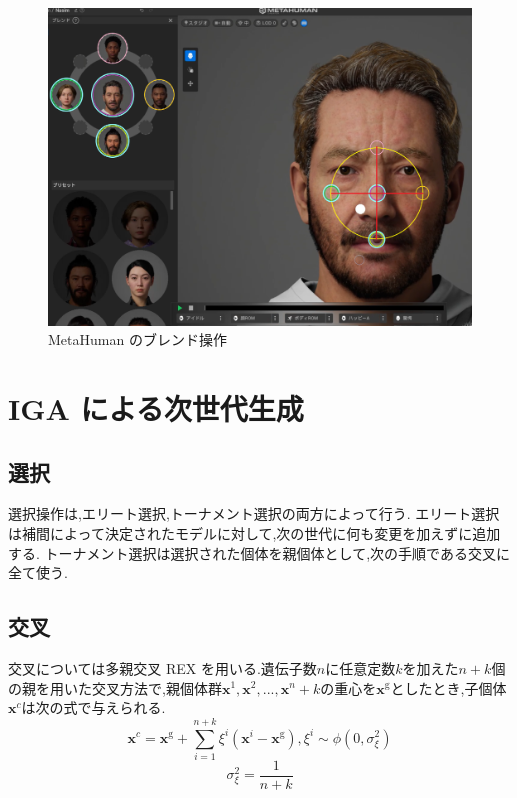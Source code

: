 \begin{figure}[h]
	\begin{center}
		\includegraphics[scale=0.4]{./imgs/metahuman2.PNG}
		\caption{MetaHuman のブレンド操作\label{fig:metahuman_cc2}}
	\end{center}
\end{figure}

\clearpage
\section{IGA による次世代生成}

\subsection{選択}
選択操作は,エリート選択,トーナメント選択の両方によって行う.
エリート選択は補間によって決定されたモデルに対して,次の世代に何も変更を加えずに追加する.
トーナメント選択は選択された個体を親個体として,次の手順である交叉に全て使う.

\subsection{交叉}
交叉については多親交叉 REX を用いる.遺伝子数$n$に任意定数$k$を加えた$n+k$個の親を用いた交叉方法で,親個体群$\bm{x}^1,\bm{x}^2,...,\bm{x}^n+k$の重心を$\bm{x}^\mathrm{g}$としたとき,子個体$\bm{x}^c$は次の式で与えられる.
\begin{equation}\label{eq:rex1}
    \bm{x}^c = \bm{x}^\mathrm{g} + \sum_{i=1}^{n+k} \xi^i (\bm{x}^i - \bm{x}^\mathrm{g}) ,  \xi^i\sim\phi(0,\sigma^2_\xi)
\end{equation}
\begin{equation}\label{eq:rex2}
    \sigma^2_\xi = \frac{1}{n + k}
\end{equation}

